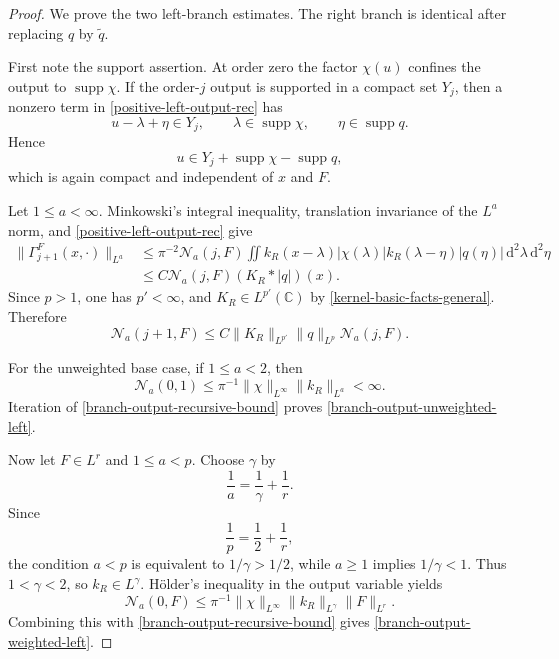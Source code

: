 \documentclass[a4paper,11pt]{article}
\newcommand{\C}{\mathbb{C}}
\newcommand{\dd}{\,\text{d}}
\theoremstyle{plain}
\theoremstyle{definition}
\theoremstyle{remark}
\begin{document}
\begin{proof}
We prove the two left-branch estimates.  The right branch is identical after
replacing $q$ by $\widetilde q$.

First note the support assertion.  At order zero the factor $\chi(u)$ confines
the output to $\operatorname{supp}\chi$.  If the order-$j$ output is supported
in a compact set $Y_j$, then a nonzero term in
\eqref{positive-left-output-rec} has
\[
        u-\lambda+\eta\in Y_j,
        \qquad \lambda\in\operatorname{supp}\chi,
        \qquad \eta\in\operatorname{supp}q.
\]
Hence
\[
        u\in Y_j+\operatorname{supp}\chi-\operatorname{supp}q,
\]
which is again compact and independent of $x$ and $F$.

Let $1\le a<\infty$.  Minkowski's integral inequality, translation invariance
of the $L^a$ norm, and \eqref{positive-left-output-rec} give
\begin{align*}
 \|\Gamma_{j+1}^F(x,\cdot)\|_{L^a}
 &\le \pi^{-2}\mathcal N_a(j,F)
 \iint k_R(x-\lambda)|\chi(\lambda)|
        k_R(\lambda-\eta)|q(\eta)|
        \dd^2\lambda\dd^2\eta \\
 &\le C\mathcal N_a(j,F)(K_R*|q|)(x).
\end{align*}
Since $p>1$, one has $p'<\infty$, and
$K_R\in L^{p'}(\C)$ by \eqref{kernel-basic-facts-general}.  Therefore
\begin{equation}\label{branch-output-recursive-bound}
 \mathcal N_a(j+1,F)
 \le C\|K_R\|_{L^{p'}}\|q\|_{L^p}\mathcal N_a(j,F).
\end{equation}

For the unweighted base case, if $1\le a<2$, then
\begin{equation}\label{branch-output-base-unweighted}
 \mathcal N_a(0,1)
 \le \pi^{-1}\|\chi\|_{L^\infty}\|k_R\|_{L^a}<\infty.
\end{equation}
Iteration of \eqref{branch-output-recursive-bound} proves
\eqref{branch-output-unweighted-left}.

Now let $F\in L^r$ and $1\le a<p$.  Choose $\gamma$ by
\begin{equation}\label{branch-output-gamma-choice}
        \frac1a=\frac1\gamma+\frac1r.
\end{equation}
Since
\[
        \frac1p=\frac12+\frac1r,
\]
the condition $a<p$ is equivalent to $1/\gamma>1/2$, while $a\ge1$ implies
$1/\gamma<1$.  Thus $1<\gamma<2$, so $k_R\in L^\gamma$.  H\"older's inequality
in the output variable yields
\begin{equation}\label{branch-output-base-weighted}
 \mathcal N_a(0,F)
 \le \pi^{-1}\|\chi\|_{L^\infty}
       \|k_R\|_{L^\gamma}\|F\|_{L^r}.
\end{equation}
Combining this with \eqref{branch-output-recursive-bound} gives
\eqref{branch-output-weighted-left}.
\end{proof}
\end{document}
